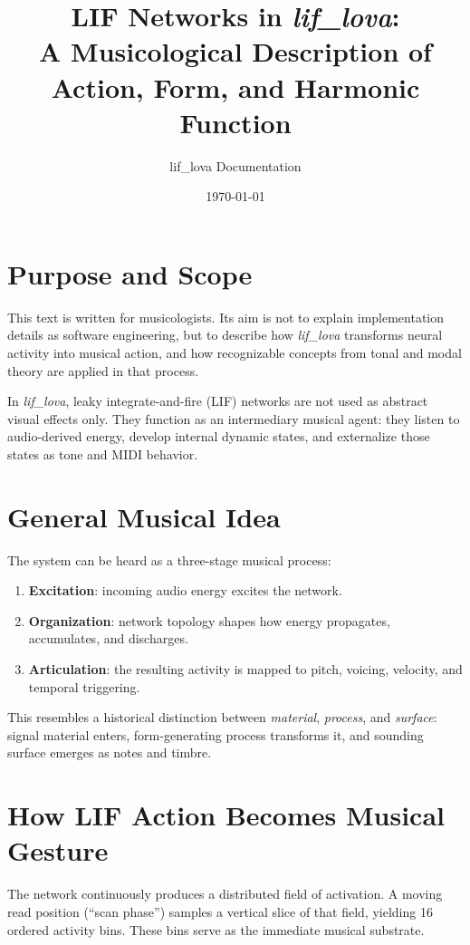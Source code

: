 \documentclass[11pt,a4paper]{article}
\title{LIF Networks in \textit{lif\_lova}:\\
\large A Musicological Description of Action, Form, and Harmonic Function}
\author{lif\_lova Documentation}
\date{\today}
\begin{document}
\maketitle
\onehalfspacing

\section*{Purpose and Scope}

This text is written for musicologists. Its aim is not to explain implementation details as
software engineering, but to describe how \textit{lif\_lova} transforms neural activity into
musical action, and how recognizable concepts from tonal and modal theory are applied in that
process.

In \textit{lif\_lova}, leaky integrate-and-fire (LIF) networks are not used as abstract visual
effects only. They function as an intermediary musical agent: they listen to audio-derived energy,
develop internal dynamic states, and externalize those states as tone and MIDI behavior.

\section*{General Musical Idea}

The system can be heard as a three-stage musical process:
\begin{enumerate}[label=\arabic*.]
    \item \textbf{Excitation}: incoming audio energy excites the network.
    \item \textbf{Organization}: network topology shapes how energy propagates, accumulates,
    and discharges.
    \item \textbf{Articulation}: the resulting activity is mapped to pitch, voicing,
    velocity, and temporal triggering.
\end{enumerate}

This resembles a historical distinction between \emph{material}, \emph{process}, and
\emph{surface}: signal material enters, form-generating process transforms it, and sounding surface
emerges as notes and timbre.

\section*{How LIF Action Becomes Musical Gesture}

The network continuously produces a distributed field of activation. A moving read position
(``scan phase'') samples a vertical slice of that field, yielding 16 ordered activity bins.
These bins serve as the immediate musical substrate.
\end{document}
